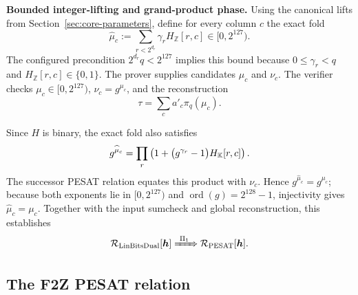 \smallskip
\noindent\textbf{Bounded integer-lifting and grand-product phase.}
Using the canonical lifts from Section~\ref{sec:core-parameters}, define for
every column $c$ the exact fold
\begin{equation}
 \widehat\mu_c
 :=\sum_{r<2^{d_r}}\gamma_rH_{\mathbb Z}[r,c]
 \in[0,2^{127}).
\end{equation}
The configured precondition $2^{d_r}q<2^{127}$ implies this bound because
$0\le\gamma_r<q$ and $H_{\mathbb Z}[r,c]\in\{0,1\}$.  The prover supplies
candidates $\mu_c$ and $\nu_c$.  The verifier checks
$\mu_c\in[0,2^{127})$, $\nu_c=g^{\mu_c}$, and the reconstruction
\begin{equation}
 \tau=\sum_c a'_c\pi_q(\mu_c).
\label{eq:pi1-fold-reconstruction}
\end{equation}

Since $H$ is binary, the exact fold also satisfies
\begin{equation}
 g^{\widehat\mu_c}
 =\prod_r\left(1+
    \bigl(g^{\gamma_r}-1\bigr)H_{\mathbb K}[r,c]\right).
\end{equation}
The successor PESAT relation equates this product with
$\nu_c$.  Hence $g^{\widehat\mu_c}=g^{\mu_c}$; because both exponents lie
in $[0,2^{127})$ and $\operatorname{ord}(g)=2^{128}-1$, injectivity gives
$\widehat\mu_c=\mu_c$.  Together with the input sumcheck and
global reconstruction, this establishes
\begin{equation}
 \mathcal R_{\rm LinBitsDual}[\bm h]
 \xRightarrow{\ \Pi_1\ }
 \mathcal R_{\rm PESAT}[\bm h].
 \label{eq:edge-linbits-pesat}
\end{equation}

\subsection{The F2Z PESAT relation}

